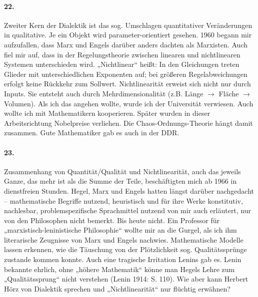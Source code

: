 \documentclass[a4paper,11pt]{article}
\begin{document}
\paragraph{22.}
Zweiter Kern der Dialektik ist das sog. Umschlagen quantitativer Veränderungen
in qualitative. Je ein Objekt wird parameter-orientiert gesehen.  1960 begann
mir aufzufallen, dass Marx und Engels darüber anders dachten als Marxisten.
Auch fiel mir auf, dass in der Regelungstheorie zwischen linearen und
nichtlinearen Systemen unterschieden wird. „Nichtlinear“ heißt: In den
Gleichungen treten Glieder mit unterschiedlichen Exponenten auf; bei größeren
Regelabweichungen erfolgt keine Rückkehr zum Sollwert. Nichtlinearität erweist
sich nicht nur durch Inputs. Sie entsteht auch durch Mehrdimensionalität
(z.B. Länge $\to$ Fläche $\to$ Volumen). Als ich das angehen wollte, wurde ich
der Universität verwiesen. Auch wollte ich mit Mathematikern kooperieren.
Später wurden in dieser Arbeitsrichtung Nobelpreise verliehen. Die
Chaos-Ordnungs-Theorie hängt damit zusammen. Gute Mathematiker gab es auch in
der DDR.

\paragraph{23.}
Zusammenhang von Quantität/Qualität und Nichtlinearität, auch das jeweils
Ganze, das mehr ist als die Summe der Teile, beschäftigten mich ab 1966 in
dienstfreien Stunden. Hegel, Marx und Engels hatten längst darüber nachgedacht
-- mathematische Begriffe nutzend, heuristisch und für ihre Werke konstitutiv,
nachlesbar, problemspezifische Sprachmittel nutzend von mir auch erläutert,
nur von den Philosophen nicht bemerkt. Bis heute nicht. Ein Professor für
„marxistisch-leninistische Philosophie“ wollte mir an die Gurgel, als ich ihm
literarische Zeugnisse von Marx und Engels nachwies.  Mathematische Modelle
lassen erkennen, wie die Täuschung von der Plötzlichkeit sog. Qualitätssprünge
zustande kommen konnte. Auch eine tragische Irritation Lenins gab es. Lenin
bekannte ehrlich, ohne „höhere Mathematik“ könne man Hegels Lehre zum
„Qualitätssprung“ nicht verstehen (Lenin 1914: S. 110).  Wie aber kann Herbert
Hörz von Dialektik sprechen und „Nichtlinearität“ nur flüchtig erwähnen?
\end{document}
